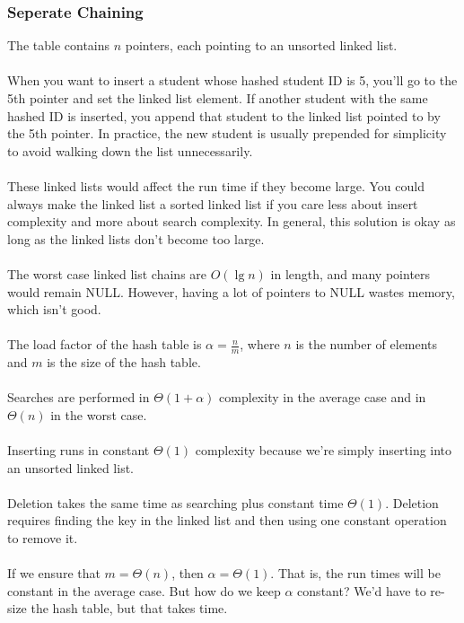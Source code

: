 \documentclass[]{article}
\theoremstyle{definition}
\begin{document}
			\subsubsection{Seperate Chaining}
				The table contains $n$ pointers, each pointing to an unsorted linked list.
				\\ \\
				When you want to insert a student whose hashed student ID is 5, you'll go to the 5th pointer and set the linked list element. If another student with the same hashed ID is inserted, you append that student to the linked list pointed to by the 5th pointer. In practice, the new student is usually prepended for simplicity \textendash{} to avoid walking down the list unnecessarily.
				\\ \\
				These linked lists would affect the run time if they become large. You could always make the linked list a sorted linked list if you care less about insert complexity and more about search complexity. In general, this solution is okay as long as the linked lists don't become too large.
				\\ \\
				The worst case linked list chains are $O(\lg n)$ in length, and many pointers would remain NULL. However, having a lot of pointers to NULL wastes memory, which isn't good.
				\\ \\
				The load factor of the hash table is $\alpha = \frac{n}{m}$, where $n$ is the number of elements and $m$ is the size of the hash table.
				\\ \\
				Searches are performed in $\Theta(1 + \alpha)$ complexity in the average case and in $\Theta(n)$ in the worst case.
				\\ \\
				Inserting runs in constant $\Theta(1)$ complexity because we're simply inserting into an unsorted linked list.
				\\ \\
				Deletion takes the same time as searching plus constant time $\Theta(1)$. Deletion requires finding the key in the linked list and then using one constant operation to remove it.
				\\ \\
				If we ensure that $m = \Theta(n)$, then $\alpha = \Theta(1)$. That is, the run times will be constant in the average case. But how do we keep $\alpha$ constant? We'd have to re-size the hash table, but that takes time.
\end{document}
